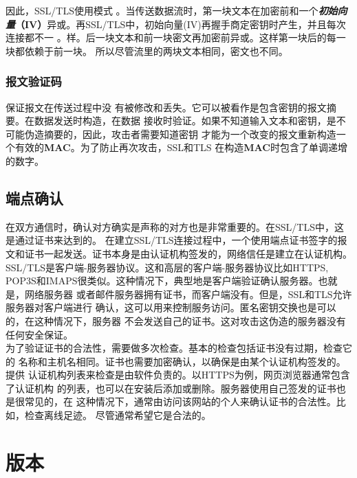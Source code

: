 \documentclass[11pt]{article}
\begin{document}
因此，SSL/TLS使用{}模式
。当传送数据流时，第一块文本在加密前和一个\textbf{{\slshape{初始向量}}{（IV）}}异或。再SSL/TLS中，初始向量(IV)再握手商定密钥时产生，并且每次连接都不一
。样。后一块文本和前一块密文再加密前异或。这样第一块后的每一块都依赖于前一块。
所以尽管流里的两块文本相同，密文也不同。\\

\subsubsection{报文验证码}

{}保证报文在传送过程中没
有被修改和丢失。它可以被看作是包含密钥的报文摘要。在数据发送时构造，在数据
接收时验证。如果不知道输入文本和密钥，是不可能伪造摘要的，因此，攻击者需要知道密钥
才能为一个改变的报文重新构造一个有效的{\bf{MAC}}。为了防止再次攻击，SSL和TLS
在构造{\bf{MAC}}时包含了单调递增的数字。

\subsection{端点确认}

 在双方通信时，确认对方确实是声称的对方也是非常重要的。在SSL/TLS中，这是通过证书来达到的。
 在建立SSL/TLS连接过程中，一个使用端点证书签字的报文和证书一起发送。证书本身是由认证机构签发的，网络信任是建立在认证机构。\\

 SSL/TLS是客户端-服务器协议。这和高层的客户端-服务器协议比如HTTPS,
 POP3S和IMAPS很类似。这种情况下，典型地是客户端验证确认服务器。也就是，网络服务器
 或者邮件服务器拥有证书，而客户端没有。但是，SSL和TLS允许服务器对客户端进行
 确认，这可以用来控制服务访问。匿名密钥交换也是可以的，在这种情况下，服务器
 不会发送自己的证书。这对攻击这伪造的服务器没有任何安全保证。 \\

 为了验证证书的合法性，需要做多次检查。基本的检查包括证书没有过期，检查它的
 名称和主机名相同。证书也需要加密确认，以确保是由某个认证机构签发的。提供
 认证机构列表来检查是由软件负责的。以HTTPS为例，网页浏览器通常包含了认证机构
 的列表，也可以在安装后添加或删除。服务器使用自己签发的证书也是很常见的，在
 这种情况下，通常由访问该网站的个人来确认证书的合法性。比如，检查离线足迹。
尽管通常希望它是合法的。

\section{版本}
\end{document}
